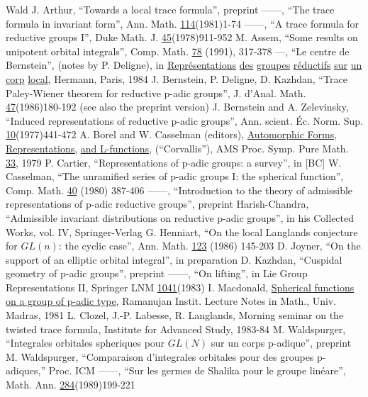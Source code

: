 \documentclass[12pt]{article}
\begin{document}
\begin{thebibliography}{Wald}
 J. Arthur, ``Towards a local trace formula'', preprint
 ------, ``The trace formula in invariant form'', Ann. Math. \underline{114}(1981)1-74
 ------, ``A trace formula for reductive groups I'', Duke Math. J. \underline{45}(1978)911-952
 M. Assem, ``Some results on unipotent orbital integrals'', Comp. Math. \underline{78} (1991), 317-378
 ---, ``Le centre de Bernstein'', (notes by P. Deligne), in \underline{Repr\'esentations} \underline{des} \underline{groupes} \underline{r\'eductifs} \underline{sur} \underline{un} \underline{corp} \underline{local}, Hermann, Paris, 1984
 J. Bernstein, P. Deligne, D. Kazhdan, ``Trace Paley-Wiener theorem for reductive p-adic groups'', J. d'Anal. Math. \underline{47}(1986)180-192 (see also the preprint version)
 J. Bernstein and A. Zelevinsky, ``Induced representations of reductive p-adic groups'', Ann. scient. \'Ec. Norm. Sup. \underline{10}(1977)441-472
 A. Borel and W. Casselman (editors), \underline{Automorphic Forms, Representations,} \underline{and L-functions}, (``Corvallis''), AMS Proc. Symp. Pure Math. \underline{33}, 1979
 P. Cartier, ``Representations of p-adic groups: a survey'', in [BC]
 W. Casselman, ``The unramified series of p-adic groups I: the spherical function'', Comp. Math. \underline{40} (1980) 387-406
 ------, ``Introduction to the theory of admissible representations of p-adic reductive groups'', preprint
 Harish-Chandra, ``Admissible invariant distributions on reductive p-adic groups'', in his Collected Works, vol. IV, Springer-Verlag
 G. Henniart, ``On the local Langlands conjecture for $GL(n)$: the cyclic case'', Ann. Math. \underline{123} (1986) 145-203
 D. Joyner, ``On the support of an elliptic orbital integral'', in preparation
 D. Kazhdan, ``Cuspidal geometry of p-adic groups'', preprint
 ------, ``On lifting'', in Lie Group Representations II, Springer LNM \underline{1041}(1983)
 I. Macdonald, \underline{Spherical functions on a group of p-adic type}, Ramanujan Instit. Lecture Notes in Math., Univ. Madras, 1981
 L. Clozel, J.-P. Labesse, R. Langlands, Morning seminar on the twisted trace formula, Institute for Advanced Study, 1983-84
 M. Waldspurger, ``Integrales orbitales spheriques pour $GL(N)$ sur un corps p-adique'', preprint
 M. Waldspurger, ``Comparaison d'integrales orbitales pour des groupes p-adiques,'' Proc. ICM
 ------, ``Sur les germes de Shalika pour le groupe lin\'eare'', Math. Ann. \underline{284}(1989)199-221
\end{thebibliography}
\end{document}
